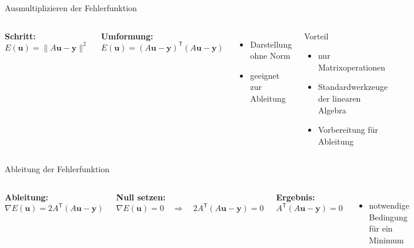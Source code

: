 \begin{frame}{Ausmultiplizieren der Fehlerfunktion}

\begin{columns}


\textbf{Schritt:}
\[
E(\mathbf{u}) = \|A\mathbf{u} - \mathbf{y}\|^2
\]

\medskip

\textbf{Umformung:}
\[
E(\mathbf{u}) = (A\mathbf{u} - \mathbf{y})^{\mathsf{T}} (A\mathbf{u} - \mathbf{y})
\]

\medskip

\begin{itemize}
\item Darstellung ohne Norm
\item geeignet zur Ableitung
\end{itemize}


\begin{block}{Vorteil}
\begin{itemize}
\item nur Matrixoperationen
\item Standardwerkzeuge der linearen Algebra
\item Vorbereitung für Ableitung
\end{itemize}
\end{block}

\end{columns}

\end{frame}

\begin{frame}{Ableitung der Fehlerfunktion}

\begin{columns}


\textbf{Ableitung:}
\[
\nabla E(\mathbf{u}) 
= 2 A^{\mathsf{T}} (A\mathbf{u} - \mathbf{y})
\]

\medskip

\textbf{Null setzen:}
\[
\nabla E(\mathbf{u}) = 0
\quad \Rightarrow \quad
2 A^{\mathsf{T}} (A\mathbf{u} - \mathbf{y}) = 0
\]

\medskip

\textbf{Ergebnis:}
\[
A^{\mathsf{T}} (A\mathbf{u} - \mathbf{y}) = 0
\]

\medskip

\begin{itemize}
\item notwendige Bedingung für ein Minimum
\end{itemize}


\centering 


\end{columns}
\end{frame}

